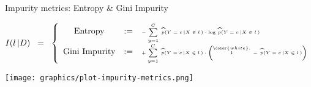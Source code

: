 \begin{frame}{\vskip -0.2cm \Large Impurity metrics: Entropy \& Gini Impurity}

\vskip -0.2cm
\tiny
\begin{equation*}
I(l\,\vert D)
\;\; = \;\;
\left\{\begin{array}{ccl}
\textnormal{Entropy}
& := &
	\textnormal{\tiny$-\;\overset{C}{\underset{y=1}{\sum}}\;\,
	\widehat{p}(Y=c\,\vert X\in l\,) \cdot \log\,\widehat{p}(Y=c\,\vert X\in l\,)$}
\\
\textnormal{Gini Impurity}
& := &
	\textnormal{\tiny$+\;\overset{C}{\underset{y=1}{\sum}}\;\,
	\widehat{p}(Y=c\,\vert X\in l\,) \cdot
	\left(\overset{{\color{white}.}}{1}\,-\,\widehat{p}(Y=c\,\vert X\in l\,)\right)$}
\end{array}\right.
\end{equation*}

\begin{center}
\vskip -0.2cm
\texttt{[image: graphics/plot-impurity-metrics.png]}
\end{center}

\end{frame}
\normalsize

